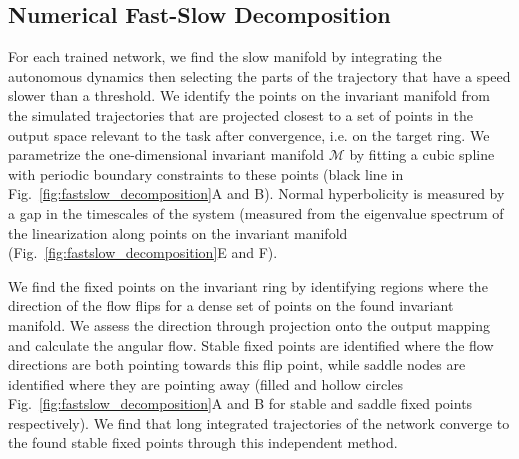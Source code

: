 \documentclass{article} %
\newcounter{ct}
\newcommand{\manifold}{\mathcal{M}}
\theoremstyle{definition}
\theoremstyle{remark}
\begin{document}
\subsection{Numerical Fast-Slow Decomposition}\label{sec:fastslowmethod}
For each trained network, we find the slow manifold by integrating the autonomous dynamics then selecting the parts of the trajectory that have a speed slower than a threshold.
We identify the points on the invariant manifold from the simulated trajectories that are projected closest to a set of points in the output space relevant to the task after convergence, i.e. on the target ring.
We parametrize the one-dimensional invariant manifold \(\manifold\) by fitting a cubic spline with periodic boundary constraints to these points (black line in Fig.~\ref{fig:fastslow_decomposition}A and B).
Normal hyperbolicity is measured by a gap in the timescales of the system (measured from the eigenvalue spectrum of the linearization along points on the invariant manifold (Fig.~\ref{fig:fastslow_decomposition}E and F).


We find the fixed points on the invariant ring by identifying regions where the direction of the flow flips for a dense set of points on the found invariant manifold.
We assess the direction through projection onto the output mapping and calculate the angular flow.
Stable fixed points are identified where the flow directions are both pointing towards this flip point,
while saddle nodes are identified where they are pointing away (filled and hollow circles Fig.~\ref{fig:fastslow_decomposition}A and B for stable and saddle fixed points respectively).
We find that long integrated trajectories of the network converge to the found stable fixed points through this independent method.
\end{document}
